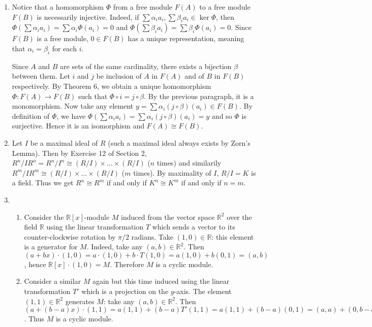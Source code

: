 \begin{enumerate}
\item
Notice that a homomorphism $\Phi$ from a free module $F(A)$ to a free module $F(B)$ is necessarily injective. Indeed, if $\sum\alpha_ia_i, \sum\beta_ia_i \in \ker\Phi$, then $\Phi(\sum\alpha_ia_i)=\sum\alpha_i\Phi(a_i)=0$ and $\Phi(\sum\beta_ia_i)=\sum\beta_i\Phi(a_i)=0$. Since $F(B)$ is a free module, $0\in F(B)$ has a unique representation, meaning that $\alpha_i=\beta_i$ for each $i$.

Since $A$ and $B$ are sets of the same cardinality, there exists a bijection $\beta$ between them. Let $i$ and $j$ be inclusion of $A$ in $F(A)$ and of $B$ in $F(B)$ respectively. By Theorem 6, we obtain a unique homomorphism $\Phi:F(A)\to F(B)$ such that $\Phi\circ i = j\circ\beta$. By the previous paragraph, it is a monomorphism. Now take any element $y=\sum\alpha_i(j\circ\beta)(a_i)\in F(B)$. By definition of $\Phi$, we have $\Phi(\sum\alpha_i a_i)=\sum\alpha_i(j\circ\beta)(a_i)=y$ and so $\Phi$ is surjective. Hence it is an isomorphism and $F(A)\cong F(B)$.

\item
Let $I$ be a maximal ideal of $R$ (such a maximal ideal always exists by Zorn's Lemma). Then by Exercise 12 of Section 2, $R^n/IR^n=R^n/I^n\cong (R/I)\times\dots\times(R/I)$ ($n$ times) and similarily $R^m/IR^m\cong (R/I)\times\dots\times(R/I)$ ($m$ times). By maximality of $I$, $R/I=K$ is a field. Thus we get $R^n\cong R^m$ if and only if $K^n\cong K^m$ if and only if $n=m$.

\item
\begin{enumerate}
\item
Consider the $\mathbb{R}[x]$-module $M$ induced from the vector space $\mathbb{R}^2$ over the field $\mathbb{R}$ using the linear transformation $T$ which sends a vector to its counter-clockwise rotation by $\pi/2$ radians. Take $(1,0)\in \mathbb{R}$: this element is a generator for $M$. Indeed, take any $(a,b)\in \mathbb{R}^2$. Then $(a+bx)\cdot(1,0) = a\cdot(1,0)+b\cdot T(1,0) = a(1,0)+b(0,1)=(a,b)$, hence $\mathbb{R}[x]\cdot(1,0)=M$. Therefore $M$ is a cyclic module.
\item
Consider a similar $M$ again but this time induced using the linear transformation $T'$ which is a projection on the $y$-axis. The element $(1,1)\in\mathbb{R}^2$ generates $M$: take any $(a,b)\in\mathbb{R}^2$. Then $(a+(b-a)x)\cdot(1,1)=a(1,1)+(b-a)T'(1,1)=a(1,1)+(b-a)(0,1)=(a,a)+(0,b-a)=(a,b)$. Thus $M$ is a cyclic module.
\end{enumerate}


\end{enumerate}
